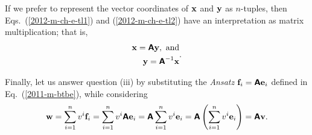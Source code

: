 If we prefer to represent the vector coordinates of
${\bf x}$ and ${\bf y}$ as $n$-tuples,
then Eqs.~(\ref{2012-m-ch-e-tl1})  and (\ref{2012-m-ch-e-tl2})
have an interpretation as matrix multiplication; that is,
\begin{equation}
\begin{split}
{\bf x} =  \textsf{\textbf{A}}{\bf y}, {\textrm{ and}} \\
{\bf y} =  \textsf{\textbf{A}}^{-1}{\bf x}
\end{split}
.
\label{2012-m-ch-e-tl3}
\end{equation}

Finally, let us answer question (iii)
by substituting the {\it Ansatz} ${\bf f}_i  =\textsf{\textbf{A}}{\bf e}_i$ defined in  Eq.~(\ref{2011-m-btbe}),
while considering
\begin{equation}
{\bf w}= \sum_{i=1}^n v^i {\bf f}_i  = \sum_{i=1}^n v^i \textsf{\textbf{A}}{\bf e}_i= \textsf{\textbf{A}} \sum_{i=1}^n v^i {\bf e}_i
= \textsf{\textbf{A}} \left( \sum_{i=1}^n v^i {\bf e}_i \right)
=   \textsf{\textbf{A}}{\bf v}
.
\end{equation}


